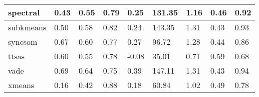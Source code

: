 \begin{table}[H]
\begin{tabular}{|l|l|l|l|l|l|l|l|l|}
\hline
spectral & 0.43 & 0.55 & 0.79 & 0.25 & 131.35 & 1.16 & 0.46 & 0.92 \\
\hline
subkmeans & 0.50 & 0.58 & 0.82 & 0.24 & 143.35 & 1.31 & 0.43 & 0.93 \\
\hline
syncsom & 0.67 & 0.60 & 0.77 & 0.27 & 96.72 & 1.28 & 0.44 & 0.86 \\
\hline
ttsas & 0.60 & 0.55 & 0.78 & -0.08 & 35.01 & 0.71 & 0.59 & 0.68 \\
\hline
vade & 0.69 & 0.64 & 0.75 & 0.39 & 147.11 & 1.31 & 0.43 & 0.94 \\
\hline
xmeans & 0.16 & 0.42 & 0.88 & 0.18 & 60.84 & 1.02 & 0.49 & 0.78 \\
\hline
\end{tabular}
\end{table}



